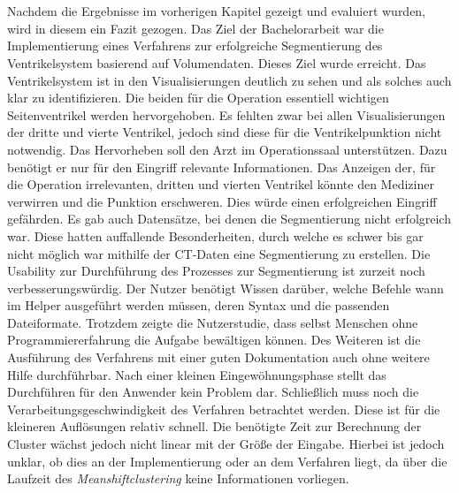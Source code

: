 \chapter{}
\label{sec:discussion}


Nachdem die Ergebnisse im vorherigen Kapitel gezeigt und evaluiert wurden, wird in diesem ein Fazit gezogen.
\newline
Das Ziel der Bachelorarbeit war die Implementierung eines Verfahrens zur erfolgreiche Segmentierung des Ventrikelsystem basierend auf Volumendaten. Dieses Ziel wurde erreicht.
\newline
Das Ventrikelsystem ist in den Visualisierungen deutlich zu sehen und als solches auch klar zu identifizieren. Die beiden für die Operation essentiell wichtigen Seitenventrikel werden hervorgehoben.
Es fehlten zwar bei allen Visualisierungen der dritte und vierte Ventrikel, jedoch sind diese für die Ventrikelpunktion nicht notwendig. Das Hervorheben soll den Arzt im Operationssaal unterstützen. Dazu benötigt er nur für den Eingriff relevante Informationen. Das Anzeigen der, für die Operation irrelevanten, dritten und vierten Ventrikel könnte den Mediziner verwirren und die Punktion erschweren. Dies würde einen erfolgreichen Eingriff gefährden.
\newline
Es gab auch Datensätze, bei denen die Segmentierung nicht erfolgreich war. Diese hatten auffallende Besonderheiten, durch welche es schwer bis gar nicht möglich war mithilfe der CT-Daten eine Segmentierung zu erstellen.
\newline
Die Usability zur Durchführung des Prozesses zur Segmentierung ist zurzeit noch verbesserungswürdig. Der Nutzer benötigt Wissen darüber, welche Befehle wann im Helper ausgeführt werden müssen, deren Syntax und die passenden Dateiformate.
\newline
Trotzdem zeigte die Nutzerstudie, dass selbst Menschen ohne Programmiererfahrung die Aufgabe bewältigen können. Des Weiteren ist die Ausführung des Verfahrens mit einer guten Dokumentation auch ohne weitere Hilfe durchführbar. Nach einer kleinen Eingewöhnungsphase stellt das Durchführen für den Anwender kein Problem dar.
\newline
Schließlich muss noch die Verarbeitungsgeschwindigkeit des Verfahren betrachtet werden. Diese ist für die kleineren Auflösungen relativ schnell. Die benötigte Zeit zur Berechnung der Cluster wächst jedoch nicht linear mit der Größe der Eingabe. Hierbei ist jedoch unklar, ob dies an der Implementierung oder an dem Verfahren liegt, da über die Laufzeit des \textit{Meanshiftclustering} keine Informationen vorliegen.



